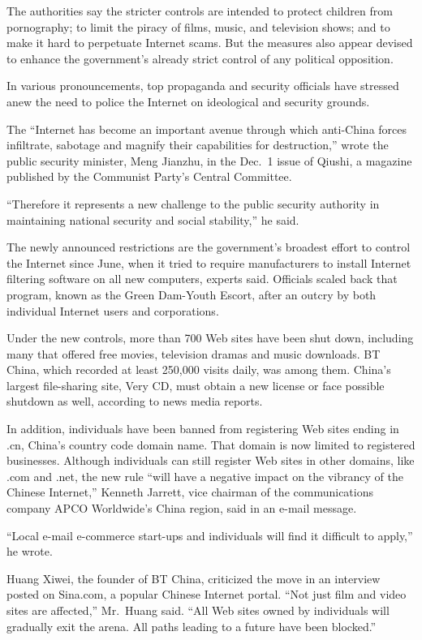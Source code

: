 ﻿\documentclass[12pt]{article}
\begin{document}
The authorities say the stricter controls are intended to protect children from pornography; to
limit the piracy of films, music, and television shows; and to make it hard to perpetuate Internet
scams. But the measures also appear devised to enhance the government's already strict control of
any political opposition.

In various pronouncements, top propaganda and security officials have stressed anew the need to
police the Internet on ideological and security grounds.

The ``Internet has become an important avenue through which anti-China forces infiltrate, sabotage
and magnify their capabilities for destruction,'' wrote the public security minister, Meng Jianzhu,
in the Dec.~1 issue of Qiushi, a magazine published by the Communist Party's Central Committee.

``Therefore it represents a new challenge to the public security authority in maintaining national
security and social stability,'' he said.

The newly announced restrictions are the government's broadest effort to control the Internet since
June, when it tried to require manufacturers to install Internet filtering software on all new
computers, experts said. Officials scaled back that program, known as the Green Dam-Youth Escort,
after an outcry by both individual Internet users and corporations.

Under the new controls, more than 700 Web sites have been shut down, including many that offered
free movies, television dramas and music downloads. BT China, which recorded at least 250,000 visits
daily, was among them. China's largest file-sharing site, Very CD, must obtain a new license or face
possible shutdown as well, according to news media reports.

In addition, individuals have been banned from registering Web sites ending in .cn, China's country
code domain name. That domain is now limited to registered businesses. Although individuals can
still register Web sites in other domains, like .com and .net, the new rule ``will have a negative
impact on the vibrancy of the Chinese Internet,'' Kenneth Jarrett, vice chairman of the
communications company APCO Worldwide's China region, said in an e-mail message.

``Local e-mail e-commerce start-ups and individuals will find it difficult to apply,'' he wrote.

Huang Xiwei, the founder of BT China, criticized the move in an interview posted on Sina.com, a
popular Chinese Internet portal. ``Not just film and video sites are affected,'' Mr.~Huang said.
``All Web sites owned by individuals will gradually exit the arena. All paths leading to a future
have been blocked.''
\end{document}
